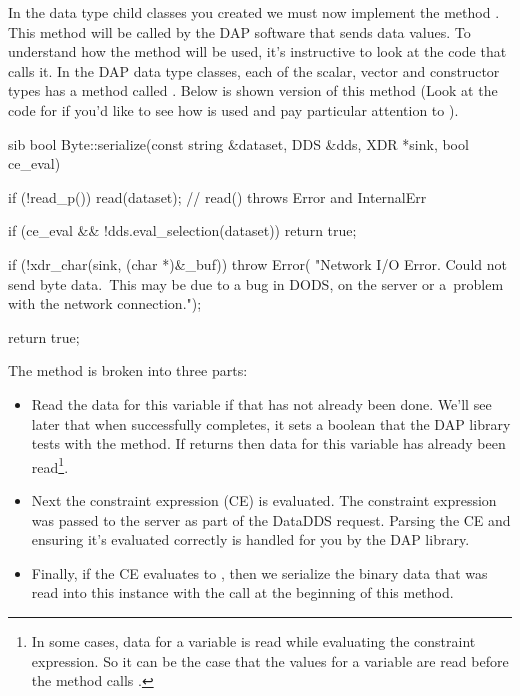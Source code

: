 \documentclass{dods-paper}
\begin{document}
In the data type child classes you created we must now implement the method
. This method will be called by the DAP software that sends data
values. To understand how the  method will be used, it's
instructive to look at the code that calls it. In the DAP data type classes,
each of the scalar, vector and constructor types has a method called
. Below is shown
version of this method (Look at the code for
if you'd like to see how  is used and pay particular
attention to ).


\begin{vcode}{sib}
bool
Byte::serialize(const string &dataset, DDS &dds, XDR *sink, bool ce_eval)
{
    if (!read_p())
        read(dataset);          // read() throws Error and InternalErr

    if (ce_eval && !dds.eval_selection(dataset))
        return true;

    if (!xdr_char(sink, (char *)&_buf))
        throw Error(
"Network I/O Error. Could not send byte data.\n\
This may be due to a bug in DODS, on the server or a\n\
problem with the network connection.");

    return true;
}
\end{vcode}

The  method is broken into three parts:
\begin{itemize}
\item Read the data for this variable if that has not already been done.
  We'll see later that when  successfully completes, it sets a
  boolean that the DAP library tests with the \lit{read\_p()} method. If
  \lit{read\_p()} returns \lit{true} then data for this variable has already
  been read\footnote{In some cases, data for a variable is read while
    evaluating the constraint expression. So it can be the case that the
    values for a variable are read before the \lit{serialize()} method calls
    \lit{read()}.}.
  
\item Next the constraint expression (CE) is evaluated. The constraint
  expression was passed to the server as part of the DataDDS request. Parsing
  the CE and ensuring it's evaluated correctly is handled for you by the DAP
  library.
  
\item Finally, if the CE evaluates to , then we serialize
  the binary data that was read into this instance with the
  \lit{read()} call at the beginning of this method.
\end{itemize}
\end{document}
